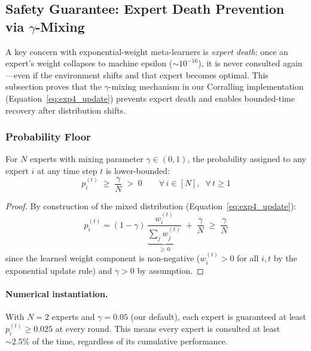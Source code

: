 
\subsection{Safety Guarantee: Expert Death Prevention via $\gamma$-Mixing}
\label{appendix:safety_guarantee}

A key concern with exponential-weight meta-learners is \emph{expert death}:
once an expert's weight collapses to machine epsilon (${\sim}10^{-16}$), it is
never consulted again---even if the environment shifts and that expert becomes
optimal.  This subsection proves that the $\gamma$-mixing mechanism in our
Corralling implementation (Equation~\ref{eq:exp4_update}) prevents expert death
and enables bounded-time recovery after distribution shifts.

\subsubsection{Probability Floor}

\begin{theorem}
\label{thm:prob_floor}
For $N$ experts with mixing parameter $\gamma \in (0, 1)$, the probability
assigned to any expert $i$ at any time step $t$ is lower-bounded:
\begin{equation}
p_i^{(t)} \;\geq\; \frac{\gamma}{N} \;>\; 0
\qquad \forall\, i \in [N],\;\; \forall\, t \geq 1
\label{eq:prob_floor}
\end{equation}
\end{theorem}

\begin{proof}
By construction of the mixed distribution (Equation~\ref{eq:exp4_update}):
\begin{equation*}
p_i^{(t)}
= (1 - \gamma)\,\underbrace{\frac{w_i^{(t)}}{\sum_j w_j^{(t)}}}_{\geq\, 0}
\;+\; \frac{\gamma}{N}
\;\geq\; \frac{\gamma}{N}
\end{equation*}
since the learned weight component is non-negative ($w_i^{(t)} > 0$ for all $i, t$
by the exponential update rule) and $\gamma > 0$ by assumption.
\end{proof}

\paragraph{Numerical instantiation.}
With $N = 2$ experts and $\gamma = 0.05$ (our default), each expert is
guaranteed at least $p_i^{(t)} \geq 0.025$ at every round.  This means
every expert is consulted at least ${\sim}2.5\%$ of the time, regardless of
its cumulative performance.

